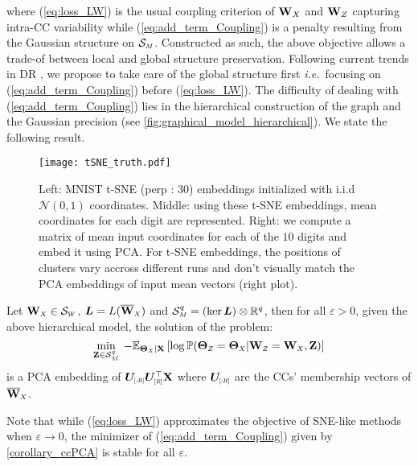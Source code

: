 where (\ref{eq:loss_LW}) is the usual coupling criterion of $\mathbf{W}_X$ and $\mathbf{W}_Z$ capturing intra-CC variability while (\ref{eq:add_term_Coupling}) is a penalty resulting from the Gaussian structure on $\mathcal{S}_{\scaleto{M}{4pt}}$. Constructed as such, the above objective allows a trade-of between local and global structure preservation. Following current trends in DR \cite{kobak2021initialization}, we propose to take care of the global structure first \textit{i.e.}\ focusing on (\ref{eq:add_term_Coupling}) before (\ref{eq:loss_LW}). The difficulty of dealing with (\ref{eq:add_term_Coupling}) lies in the hierarchical construction of the graph and the Gaussian precision (see \cref{fig:graphical_model_hierarchical}). We state the following result.

\begin{wrapfigure}[15]{R}{0.5\textwidth}
\begin{center}
\centerline{\texttt{[image: tSNE\_truth.pdf]}}
\caption{Left: MNIST t-SNE (perp : 30) embeddings initialized with i.i.d $\mathcal{N}(0,1)$ coordinates. Middle: using these t-SNE embeddings, mean coordinates for each digit are represented. Right: we compute a matrix of mean input coordinates for each of the $10$ digits and embed it using PCA. For t-SNE embeddings, the positions of clusters vary accross different runs and don't visually match the PCA embeddings of input mean vectors (right plot).}
\label{fig:tSNE-clusters-truth}
\end{center}
\end{wrapfigure}

\begin{corollary}\label{corollary_ccPCA}
Let $\W_{\scaleto{X}{4pt}} \in \mathcal{S}_{\scaleto{W}{4pt}}$, $\bm{L} = L(\overline{\W}_{\scaleto{X}{4pt}})$ and $\mathcal{S}^q_{\scaleto{M}{4pt}}= (\ker \bm{L}) \otimes \mathbb{R}^q$, then for all $\varepsilon > 0$, given the above hierarchical model, the solution of the problem:
$$\min_{\Z \in \mathcal{S}^q_{M}} \: -\mathbb{E}_{\bm{\Theta}_{\scaleto{X}{3pt}}| \X}\left[ \log \mathbb{P}(\bm{\Theta}_{\scaleto{Z}{4pt}} = \bm{\Theta}_{\scaleto{X}{4pt}}| \W_{\scaleto{Z}{4pt}} = \W_{\scaleto{X}{4pt}}, \Z) \right]$$
is a PCA embedding of $\bm{U}_{\scaleto{[:R]}{5pt}}\bm{U}_{\scaleto{[R]}{5pt}}^\top\X$ where $\bm{U}_{\scaleto{[:R]}{5pt}}$ are the CCs' membership vectors of $\overline{\W}_{\scaleto{X}{4pt}}$.
\end{corollary}

\begin{remark}
Note that while (\ref{eq:loss_LW}) approximates the objective of SNE-like methods when $\varepsilon \to 0$, the minimizer of (\ref{eq:add_term_Coupling}) given by \cref{corollary_ccPCA} is stable for all $\varepsilon$.
\end{remark}

